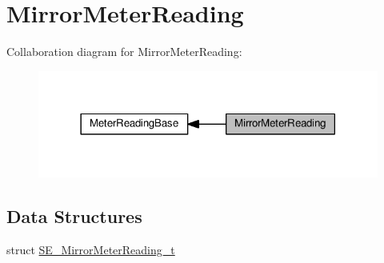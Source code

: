 \hypertarget{group__MirrorMeterReading}{}\section{Mirror\+Meter\+Reading}
\label{group__MirrorMeterReading}
Collaboration diagram for Mirror\+Meter\+Reading\+:\nopagebreak
\begin{figure}[H]
\begin{center}
\leavevmode
\includegraphics[width=318pt]{group__MirrorMeterReading}
\end{center}
\end{figure}
\subsection*{Data Structures}
\begin{DoxyCompactItemize}
\item 
struct \hyperlink{structSE__MirrorMeterReading__t}{S\+E\+\_\+\+Mirror\+Meter\+Reading\+\_\+t}
\end{DoxyCompactItemize}
